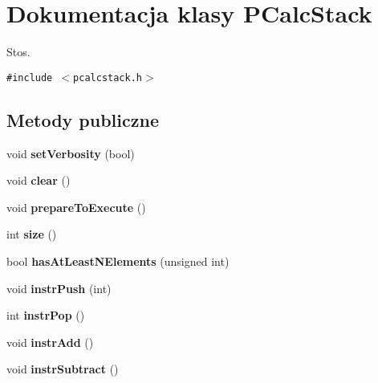 \hypertarget{classPCalcStack}{
\section{Dokumentacja klasy PCalcStack}
\label{classPCalcStack}
}
Stos.  


{\tt \#include $<$pcalcstack.h$>$}

\subsection*{Metody publiczne}
\begin{CompactItemize}
\item 
\hypertarget{classPCalcStack_6a831a20f4dec457de9f880202cf2e33}{
void \textbf{setVerbosity} (bool)}
\label{classPCalcStack_6a831a20f4dec457de9f880202cf2e33}

\item 
\hypertarget{classPCalcStack_7b1abd7a77db664dcf9e0bd56c17301f}{
void \textbf{clear} ()}
\label{classPCalcStack_7b1abd7a77db664dcf9e0bd56c17301f}

\item 
\hypertarget{classPCalcStack_b3129921fea95a4df231201e2601e1c0}{
void \textbf{prepareToExecute} ()}
\label{classPCalcStack_b3129921fea95a4df231201e2601e1c0}

\item 
\hypertarget{classPCalcStack_e334a37c1749b028e75e0d251afe47f7}{
int \textbf{size} ()}
\label{classPCalcStack_e334a37c1749b028e75e0d251afe47f7}

\item 
\hypertarget{classPCalcStack_39d4d9e53e8b57fa934ee1a5b9171dc8}{
bool \textbf{hasAtLeastNElements} (unsigned int)}
\label{classPCalcStack_39d4d9e53e8b57fa934ee1a5b9171dc8}

\item 
\hypertarget{classPCalcStack_269ca0f8f0a4395a0035fa0a9bc813a1}{
void \textbf{instrPush} (int)}
\label{classPCalcStack_269ca0f8f0a4395a0035fa0a9bc813a1}

\item 
\hypertarget{classPCalcStack_796ba40ffc60b05a8a116d881aa2e37f}{
int \textbf{instrPop} ()}
\label{classPCalcStack_796ba40ffc60b05a8a116d881aa2e37f}

\item 
\hypertarget{classPCalcStack_04ef30536acac1b02093153f1cb83353}{
void \textbf{instrAdd} ()}
\label{classPCalcStack_04ef30536acac1b02093153f1cb83353}

\item 
\hypertarget{classPCalcStack_a35493e8dc971fc2f47a113a6d400784}{
void \textbf{instrSubtract} ()}
\label{classPCalcStack_a35493e8dc971fc2f47a113a6d400784}


\end{CompactItemize}
